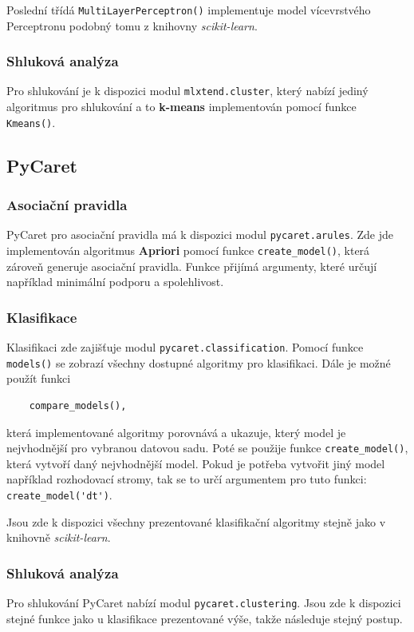 Poslední třídá \verb|MultiLayerPerceptron()| implementuje model vícevrstvého Perceptronu podobný tomu z knihovny \textit{scikit-learn}.

\subsubsection*{Shluková analýza}
Pro shlukování je k dispozici modul \verb|mlxtend.cluster|, který nabízí jediný algoritmus pro shlukování a to \textbf{k-means} implementován pomocí funkce \verb|Kmeans()|.

\subsection{PyCaret}
\subsubsection*{Asociační pravidla}
PyCaret pro asociační pravidla má k dispozici modul \verb|pycaret.arules|.  Zde jde implementován algoritmus \textbf{Apriori} pomocí funkce \verb|create_model()|, která zároveň generuje asociační pravidla. Funkce přijímá argumenty, které určují například minimální podporu a spolehlivost. 

\subsubsection*{Klasifikace}
Klasifikaci zde zajišťuje modul \verb|pycaret.classification|. Pomocí funkce \verb|models()| se zobrazí všechny dostupné algoritmy pro klasifikaci. Dále je možné použít funkci \begin{verbatim}
    compare_models(),
\end{verbatim}která implementované algoritmy porovnává a ukazuje, který model je nejvhodnější pro vybranou datovou sadu. Poté se použije funkce \verb|create_model()|, která vytvoří daný nejvhodnější model. Pokud je potřeba vytvořit jiný model například rozhodovací stromy, tak se to určí argumentem pro tuto funkci: \verb|create_model('dt')|. 

Jsou zde k dispozici všechny prezentované klasifikační algoritmy stejně jako v knihovně \textit{scikit-learn}.

\subsubsection*{Shluková analýza}
Pro shlukování PyCaret nabízí modul \verb|pycaret.clustering|. Jsou zde k dispozici stejné funkce jako u klasifikace prezentované výše, takže následuje stejný postup. 

